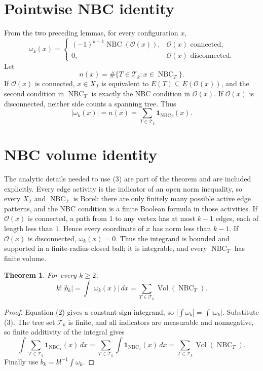 \documentclass[11pt]{article}
\newtheorem{theorem}{Theorem}
\newcommand{\NBC}{\operatorname{NBC}}
\newcommand{\Vol}{\operatorname{Vol}}
\newcommand{\calT}{\mathcal{T}}
\newcommand{\calO}{\mathcal{O}}
\newcommand{\1}{\mathbf{1}}
\begin{document}
\section{Pointwise NBC identity}

From the two preceding lemmas, for every configuration $x$,
\[
 \omega_k(x)=
 \begin{cases}
 (-1)^{k-1}\NBC(\calO(x)),&\calO(x)\text{ connected},\\
 0,&\calO(x)\text{ disconnected}.
 \end{cases}
\tag{2}
\]
Let
\[
 n(x)=\#\{T\in\calT_k:x\in\NBC_T\}.
\]
If $\calO(x)$ is connected, $x\in X_T$ is equivalent to
$E(T)\subseteq E(\calO(x))$, and the second condition in $\NBC_T$ is exactly
the NBC condition in $\calO(x)$.  If $\calO(x)$ is disconnected, neither side
counts a spanning tree.  Thus
\[
 |\omega_k(x)|=n(x)=\sum_{T\in\calT_k}\1_{\NBC_T}(x).
\tag{3}
\]

\section{NBC volume identity}

The analytic details needed to use (3) are part of the theorem and are included
explicitly.
Every edge activity is the indicator of an open norm inequality, so every
$X_T$ and $\NBC_T$ is Borel: there are only finitely many possible active
edge patterns, and the NBC condition is a finite Boolean formula in those
activities.  If $\calO(x)$ is connected, a path from $1$ to any vertex has at
most $k-1$ edges, each of length less than $1$.  Hence every coordinate of
$x$ has norm less than $k-1$.  If $\calO(x)$ is disconnected, $\omega_k(x)=0$.
Thus the integrand is bounded and supported in a finite-radius closed ball;
it is integrable, and every $\NBC_T$ has finite volume.

\begin{theorem}
For every $k\ge2$,
\[
 k!\,|b_k|=\int |\omega_k(x)|\,dx
 =\sum_{T\in\calT_k}\Vol(\NBC_T).
\tag{4}
\]
\end{theorem}

\begin{proof}
Equation (2) gives a constant-sign integrand, so
$|\int\omega_k|=\int|\omega_k|$.  Substitute (3).  The tree set
$\calT_k$ is finite, and all indicators are measurable and nonnegative, so
finite additivity of the integral gives
\[
 \int\sum_{T\in\calT_k}\1_{\NBC_T}(x)\,dx
 =\sum_{T\in\calT_k}\int\1_{\NBC_T}(x)\,dx
 =\sum_{T\in\calT_k}\Vol(\NBC_T).
\]
Finally use $b_k=k!^{-1}\int\omega_k$.
\end{proof}
\end{document}
